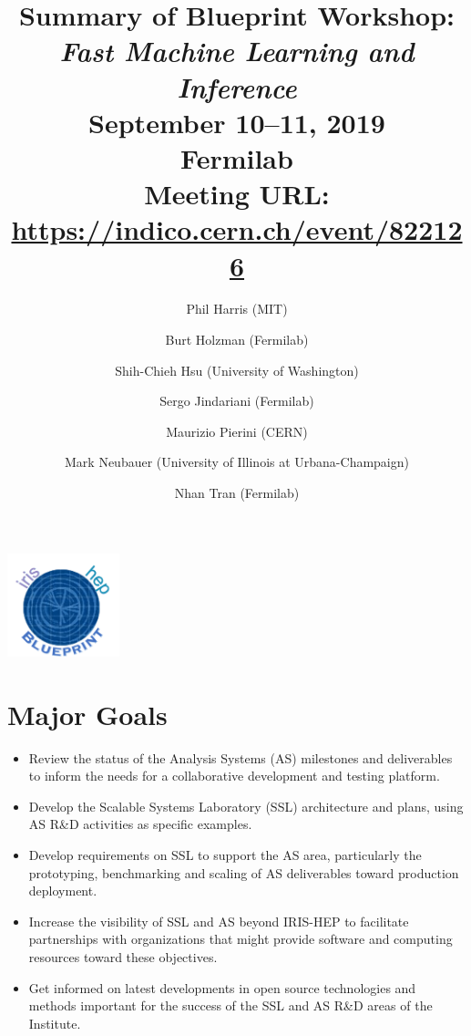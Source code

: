 \documentclass[11pt,letterpaper,fleqn]{article}
\date{} %
\title{\large Summary of Blueprint Workshop: \\
\vspace{1pt}
\LARGE \textit{Fast Machine Learning and Inference} \\
\color{black} \normalsize
\vspace{10pt}
September 10--11, 2019 \\
Fermilab \\
Meeting URL: \href{https://indico.cern.ch/event/822126}{https://indico.cern.ch/event/822126}
} %
\author{Phil Harris {\normalfont(MIT)}
      \and  Burt Holzman {\normalfont(Fermilab)}
      \and  Shih-Chieh Hsu {\normalfont(University of Washington)}
      \and  Sergo Jindariani {\normalfont(Fermilab)}
      \and  Maurizio Pierini {\normalfont(CERN)}
      \and  Mark Neubauer {\normalfont(University of Illinois at Urbana-Champaign)}
      \and  Nhan Tran {\normalfont(Fermilab)}
      }
\begin{document}
\maketitle %
\normalfont

\thispagestyle{firststyle}

\vspace{-420pt}
\hspace{360pt}
\includegraphics[height=30mm]{../../../figures/iris-hep-bluprint-logo.png}

\vspace{290pt}
\section*{Major Goals}
\vspace{3pt}
\begin{itemize}
  \item Review the status of the Analysis Systems (AS) milestones and deliverables to inform the needs for a collaborative development and testing platform.
  \item Develop the Scalable Systems Laboratory (SSL) architecture and plans, using AS R\&D activities as specific examples.
  \item Develop requirements on SSL to support the AS area, particularly the prototyping, benchmarking and scaling of AS deliverables toward production deployment.
  \item Increase the visibility of SSL and AS beyond IRIS-HEP to facilitate partnerships with organizations that might provide software and computing resources toward these objectives.
  \item Get informed on latest developments in open source technologies and methods important for the success of the SSL and AS R\&D areas of the Institute.
\end{itemize}
\end{document}
